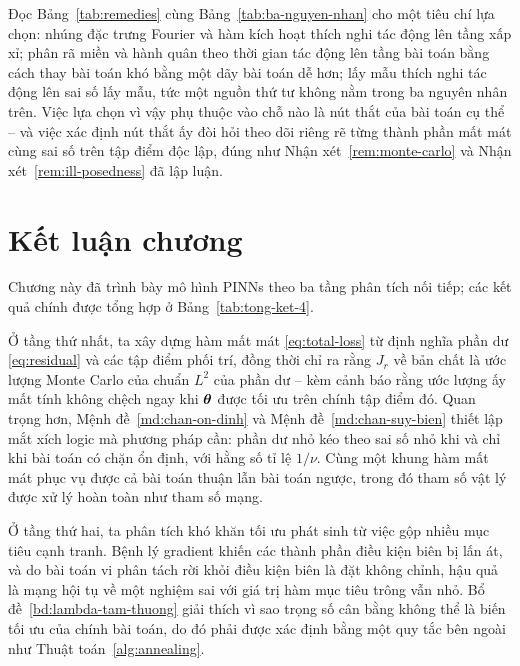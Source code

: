 Đọc Bảng~\ref{tab:remedies} cùng Bảng~\ref{tab:ba-nguyen-nhan} cho một tiêu chí
lựa chọn: nhúng đặc trưng Fourier và hàm kích hoạt thích nghi tác động lên tầng
xấp xỉ; phân rã miền và hành quân theo thời gian tác động lên tầng bài toán bằng
cách thay bài toán khó bằng một dãy bài toán dễ hơn; lấy mẫu thích nghi tác động
lên sai số lấy mẫu, tức một nguồn thứ tư không nằm trong ba nguyên nhân trên. Việc
lựa chọn vì vậy phụ thuộc vào chỗ nào là nút thắt của bài toán cụ thể -- và việc
xác định nút thắt ấy đòi hỏi theo dõi riêng rẽ từng thành phần mất mát cùng sai số
trên tập điểm độc lập, đúng như Nhận xét~\ref{rem:monte-carlo} và
Nhận xét~\ref{rem:ill-posedness} đã lập luận.
 
\section*{Kết luận chương}
 
Chương này đã trình bày mô hình PINNs theo ba tầng phân tích nối tiếp; các kết
quả chính được tổng hợp ở Bảng~\ref{tab:tong-ket-4}.
 
Ở tầng thứ nhất, ta xây dựng hàm mất mát \eqref{eq:total-loss} từ định nghĩa phần
dư \eqref{eq:residual} và các tập điểm phối trí, đồng thời chỉ ra rằng $J_{r}$ về
bản chất là ước lượng Monte Carlo của chuẩn $L^{2}$ của phần dư -- kèm cảnh báo
rằng ước lượng ấy mất tính không chệch ngay khi $\bm{\theta}$ được tối ưu trên chính
tập điểm đó. Quan trọng hơn, Mệnh đề~\ref{md:chan-on-dinh} và
Mệnh đề~\ref{md:chan-suy-bien} thiết lập mắt xích logic mà phương pháp cần: phần
dư nhỏ kéo theo sai số nhỏ khi và chỉ khi bài toán có chặn ổn định, với hằng số
tỉ lệ $1/\nu$. Cùng một khung hàm mất mát phục vụ được cả bài toán thuận lẫn bài
toán ngược, trong đó tham số vật lý được xử lý hoàn toàn như tham số mạng.
 
Ở tầng thứ hai, ta phân tích khó khăn tối ưu phát sinh từ việc gộp nhiều mục tiêu
cạnh tranh. Bệnh lý gradient khiến các thành phần điều kiện biên bị lấn át, và do
bài toán vi phân tách rời khỏi điều kiện biên là đặt không chỉnh, hậu quả là mạng
hội tụ về một nghiệm sai với giá trị hàm mục tiêu trông vẫn nhỏ.
Bổ đề~\ref{bd:lambda-tam-thuong} giải thích vì sao trọng số cân bằng không thể là
biến tối ưu của chính bài toán, do đó phải được xác định bằng một quy tắc bên
ngoài như Thuật toán~\ref{alg:annealing}.
 
